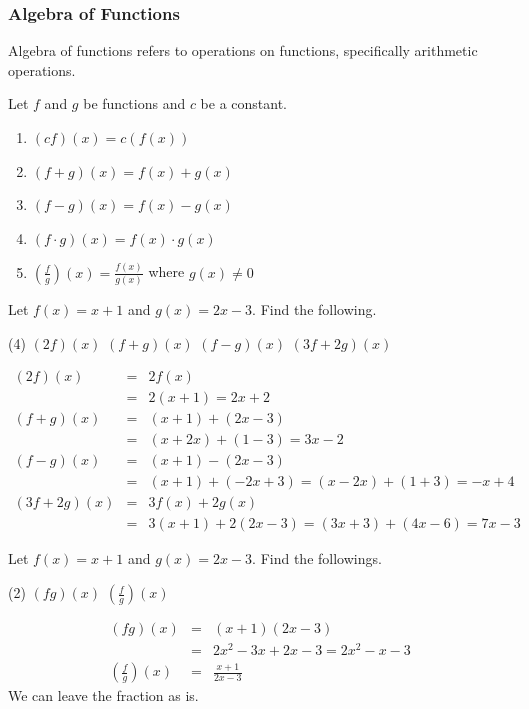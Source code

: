 \begin{frame}
\frametitle{Algebra of Functions}
Algebra of functions refers to operations on functions, specifically arithmetic operations.
\begin{prop}{}{}
Let $f$ and $g$ be functions and $c$ be a constant.
\begin{enumerate}
\item $(cf) (x) = c ( f(x) )$ 
\item $(f+g) (x) = f(x) + g(x)$ 
\item $(f-g) (x) = f(x) - g(x)$
\item $(f \cdot g) (x) = f(x) \cdot g(x) $
\item $ \left(\frac{f}{g}\right)(x) = \frac{f(x)}{g(x)}$ where $g(x) \neq 0$
\end{enumerate}
\end{prop}
\end{frame}


\begin{frame}[t]
\begin{ex}
Let $f(x) = x+1$ and $g(x) = 2x-3$. Find the following.
\begin{tasks}(4)
\task $(2f)(x)$
\task $(f+g)(x)$ 
\task $(f - g)(x)$
\task $(3f + 2g)(x)$
\end{tasks}
\end{ex}
\begin{sol}
\begin{eqnarray*}
(2f)(x)  &=& 2f(x)  \\ 
&=& 2(x+1)  = 2x+2 \\ 
(f+g)(x)  &=& (x+1) + (2x-3)  \\ 
&=& (x+2x) + (1-3)  = 3x-2 \\ 
(f-g)(x)  &=& (x+1) - (2x-3) \\ 
&=& (x+1) + (-2x + 3)  = (x-2x) + (1+3)  = -x+4 \\ 
(3f + 2g)(x) &=& 3f(x) + 2g(x) \\ 
&=& 3(x+1) + 2(2x-3)  = (3x+3) + (4x-6)  = 7x-3
\end{eqnarray*}
\end{sol}
\end{frame}


\begin{frame}[t]
\begin{ex}
Let $f(x) = x+1$ and $g(x) = 2x-3$. Find the followings.
\begin{tasks}(2)
\task $(fg)(x)$
\task $\left( \frac{f}{g} \right)(x)$
\end{tasks}
\end{ex}
\begin{sol}
\begin{eqnarray*}
(fg)(x)  &=& (x+1)(2x-3) \\ 
&=& 2x^2-3x+2x-3  = 2x^2-x-3\\ 
\left(\frac{f}{g} \right)(x)&=& \frac{x+1}{2x-3}
\end{eqnarray*}
We can leave the fraction as is.
\end{sol}
\end{frame}


